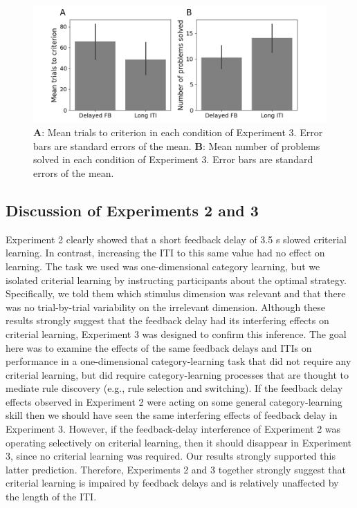 \documentclass[doc, floatsintext]{apa7}
\begin{document}
\begin{figure}
  \centering
  \includegraphics[width=.8\textwidth]{../figures/fig_exp_2_t2c.png}
    \caption{
        \textbf{A}: Mean trials to criterion in each
        condition of Experiment 3. Error bars are standard
        errors of the mean.
        \textbf{B}: Mean number of problems solved in each
        condition of Experiment 3. Error bars are standard
        errors of the mean.
}
  \label{fig_exp_2_t2c}
\end{figure}

\subsection{Discussion of Experiments 2 and 3}
Experiment 2 clearly showed that a short feedback delay of
3.5 s slowed criterial learning. In contrast, increasing the
ITI to this same value had no effect on learning. The task
we used was one-dimensional category learning, but we
isolated criterial learning by instructing participants
about the optimal strategy. Specifically, we told them which
stimulus dimension was relevant and that there was no
trial-by-trial variability on the irrelevant dimension.
Although these results strongly suggest that the feedback
delay had its interfering effects on criterial learning,
Experiment 3 was designed to confirm this inference. The
goal here was to examine the effects of the same feedback
delays and ITIs on performance in a one-dimensional
category-learning task that did not require any criterial
learning, but did require category-learning processes that
are thought to mediate rule discovery (e.g., rule selection
and switching). If the feedback delay effects observed in
Experiment 2 were acting on some general category-learning
skill then we should have seen the same interfering effects
of feedback delay in Experiment 3. However, if the
feedback-delay interference of Experiment 2 was operating
selectively on criterial learning, then it should disappear
in Experiment 3, since no criterial learning was required.
Our results strongly supported this latter prediction.
Therefore, Experiments 2 and 3 together strongly suggest
that criterial learning is impaired by feedback delays and
is relatively unaffected by the length of the ITI.
\end{document}
